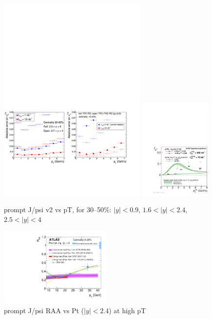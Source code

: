 \documentclass[../report.tex]{subfiles}
\begin{document}
\begin{figure}

\begin{center}
 \includegraphics[width=0.66\textwidth]{fig/alice/alice_jpsi_v2_projected.pdf}
 \includegraphics[width=0.32\textwidth]{fig/alice/alice_jpsi_v2_projected2.pdf}
\end{center}

 \caption{prompt J/psi v2 vs pT, for 30--50\%: $|y|<0.9$, $1.6<|y|<2.4$, $2.5<|y|<4$~\cite{Abelev:1475243,CERN-LHCC-2013-014}}
\end{figure}

\begin{figure}
\begin{center}
 \includegraphics[width=0.5\textwidth]{fig/atlas/atlas_promptjpsi_models}
\end{center}

 \caption{prompt J/psi RAA vs Pt ($|y|<2.4$) at high pT~\cite{Aaboud:2018quy}}
\end{figure}
\end{document}

